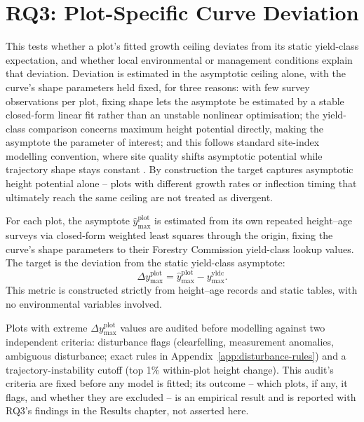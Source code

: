 \section{RQ3: Plot-Specific Curve Deviation}
\label{sec:rq3-target}
This tests whether a plot's fitted growth ceiling deviates from its static yield-class expectation, and whether local environmental or management conditions explain that deviation. Deviation is estimated in the asymptotic ceiling alone, with the curve's shape parameters held fixed, for three reasons: with few survey observations per plot, fixing shape lets the asymptote be estimated by a stable closed-form linear fit rather than an unstable nonlinear optimisation; the yield-class comparison concerns maximum height potential directly, making the asymptote the parameter of interest; and this follows standard site-index modelling convention, where site quality shifts asymptotic potential while trajectory shape stays constant \citep{socha2021Regional_C2_CR}. By construction the target captures asymptotic height potential alone -- plots with different growth rates or inflection timing that ultimately reach the same ceiling are not treated as divergent.


For each plot, the asymptote $\hat{y}_{\max}^{\text{plot}}$ is estimated from its own repeated height--age surveys via closed-form weighted least squares through the origin, fixing the curve's shape parameters to their Forestry Commission yield-class lookup values. The target is the deviation from the static yield-class asymptote:
\begin{equation}
\Delta y_{\max}^{\text{plot}} = \hat y_{\max}^{\text{plot}} - y_{\max}^{\text{yldc}}.
\label{eq:local-ymax-diff}
\end{equation}
This metric is constructed strictly from height--age records and static tables, with no environmental variables involved.

Plots with extreme $\Delta y_{\max}^{\text{plot}}$ values are audited before modelling against two independent criteria: disturbance flags (clearfelling, measurement anomalies, ambiguous disturbance; exact rules in Appendix~\ref{app:disturbance-rules}) and a trajectory-instability cutoff (top 1\% within-plot height change). This audit's criteria are fixed before any model is fitted; its outcome -- which plots, if any, it flags, and whether they are excluded -- is an empirical result and is reported with RQ3's findings in the Results chapter, not asserted here. %

